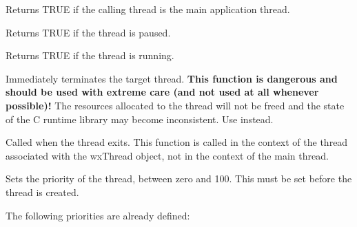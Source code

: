 \label{wxthreadismain}


Returns TRUE if the calling thread is the main application thread.

\label{wxthreadispaused}


Returns TRUE if the thread is paused.

\label{wxthreadisrunning}


Returns TRUE if the thread is running.

\label{wxthreadkill}


Immediately terminates the target thread. {\bf This function is dangerous and should
be used with extreme care (and not used at all whenever possible)!} The resources
allocated to the thread will not be freed and the state of the C runtime library
may become inconsistent. Use  instead.

\label{wxthreadonexit}


Called when the thread exits. This function is called in the context of the thread
associated with the wxThread object, not in the context of the main thread.

\label{wxthreadsetpriority}


Sets the priority of the thread, between zero and 100. This must be set before the thread is created.

The following priorities are already defined:

\twocolwidtha{7cm}
\begin{twocollist}\itemsep=0pt
\end{twocollist}

\label{wxthreadsleep}


